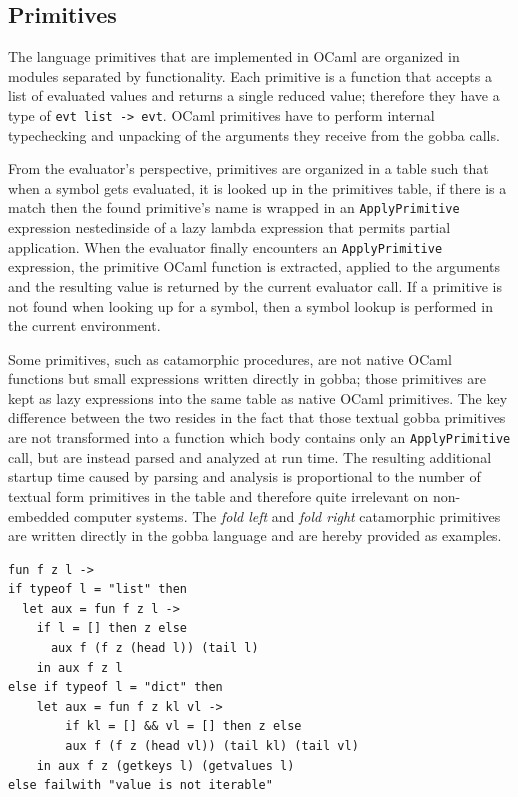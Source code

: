\documentclass[a4paper, 10pt]{article}
\theoremstyle{plain}%
\theoremstyle{definition}
\theoremstyle{remark}
\begin{document}
\begin{multicols}{2}
\section{Primitives}
The language primitives that are implemented in OCaml are organized in modules
separated by functionality. Each primitive is a function that accepts a list of
evaluated values and returns a single reduced value; therefore they have a type
of \texttt{evt list -> evt}. OCaml primitives have to perform internal
typechecking and unpacking of the arguments they receive from the gobba
calls.

From the evaluator's perspective, primitives are organized in a table
such that when a symbol gets evaluated, it is looked up in the primitives table,
if there is a match then the found primitive's name is wrapped in an
\texttt{ApplyPrimitive} expression nestedinside of a lazy lambda expression that
permits partial application. When the evaluator finally encounters an
\texttt{ApplyPrimitive} expression, the primitive OCaml function is extracted,
applied to the arguments and the resulting value is returned by the current
evaluator call. If a primitive is not found when looking up for a symbol, then a
symbol lookup is performed in the current environment.

Some primitives, such as catamorphic procedures, are not native OCaml functions
but small expressions written directly in gobba; those primitives are kept as
lazy expressions into the same table as native OCaml primitives. The key
difference between the two resides in the fact that those textual gobba
primitives are not transformed into a function which body contains only an
\texttt{ApplyPrimitive} call, but are instead parsed and analyzed at run time.
The resulting additional startup time caused by parsing and analysis is
proportional to the number of textual form primitives in the table and therefore
quite irrelevant on non-embedded computer systems. The \textit{fold left} and
\textit{fold right} catamorphic primitives are written directly in the gobba
language and are hereby provided as examples.

\begin{lstlisting}[style=caml,caption=The tail recursive left fold procedure]
fun f z l ->
if typeof l = "list" then
  let aux = fun f z l ->
    if l = [] then z else
	  aux f (f z (head l)) (tail l)
	in aux f z l
else if typeof l = "dict" then
	let aux = fun f z kl vl ->
		if kl = [] && vl = [] then z else
		aux f (f z (head vl)) (tail kl) (tail vl)
	in aux f z (getkeys l) (getvalues l)
else failwith "value is not iterable"
\end{lstlisting}


\end{multicols}
\end{document}
